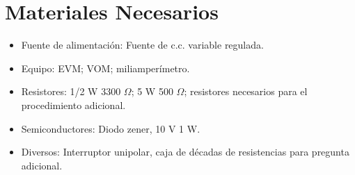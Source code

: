 \documentclass[12pt,a4paper]{article}
\begin{document}

\section*{Materiales Necesarios}
\begin{itemize}
    \item Fuente de alimentación: Fuente de c.c. variable regulada.
    \item Equipo: EVM; VOM; miliamperímetro.
    \item Resistores: 1/2 W 3300 $\Omega$; 5 W 500 $\Omega$; resistores necesarios para el procedimiento adicional.
    \item Semiconductores: Diodo zener, 10 V 1 W.
    \item Diversos: Interruptor unipolar, caja de décadas de resistencias para pregunta adicional.
\end{itemize}
\end{document}
